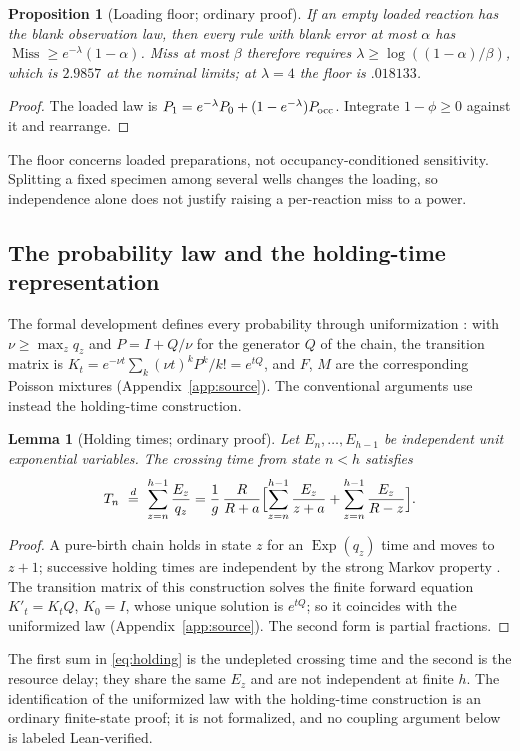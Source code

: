 \documentclass[11pt,a4paper]{article}
\theoremstyle{plain}
\newtheorem{proposition}[theorem]{Proposition}
\newtheorem{lemma}[theorem]{Lemma}
\theoremstyle{definition}
\theoremstyle{remark}
\newcommand{\Miss}{\operatorname{Miss}}
\newcommand{\Ex}{\operatorname{Exp}}
\begin{document}
\begin{proposition}[Loading floor; ordinary proof]\label{prop:floor}
If an empty loaded reaction has the blank observation law, then every rule with blank error at most $\alpha$ has $\Miss\ge e^{-\lambda}(1-\alpha)$. Miss at most $\beta$ therefore requires $\lambda\ge\log((1-\alpha)/\beta)$, which is $2.9857$ at the nominal limits; at $\lambda=4$ the floor is $.018133$.
\end{proposition}
\begin{proof}
The loaded law is $P_1=e^{-\lambda}P_0+(1-e^{-\lambda})P_{\rm occ}$. Integrate $1-\phi\ge0$ against it and rearrange.
\end{proof}
The floor concerns loaded preparations, not occupancy-conditioned sensitivity. Splitting a fixed specimen among several wells changes the loading, so independence alone does not justify raising a per-reaction miss to a power.

\subsection{The probability law and the holding-time representation}\label{sec:law}
The formal development defines every probability through uniformization \citep{jensen1953,norris1997}: with $\nu\ge\max_zq_z$ and $P=I+Q/\nu$ for the generator $Q$ of the chain, the transition matrix is $K_t=e^{-\nu t}\sum_k(\nu t)^kP^k/k!=e^{tQ}$, and $F$, $M$ are the corresponding Poisson mixtures (Appendix~\ref{app:source}). The conventional arguments use instead the holding-time construction.

\begin{lemma}[Holding times; ordinary proof]\label{lem:holding}
Let $E_n,\dots,E_{h-1}$ be independent unit exponential variables. The crossing time from state $n<h$ satisfies
\begin{equation}\label{eq:holding}
T_n\ \overset{d}{=}\ \sum_{z=n}^{h-1}\frac{E_z}{q_z}
=\frac1g\,\frac{R}{R+a}\Bigl[\sum_{z=n}^{h-1}\frac{E_z}{z+a}+\sum_{z=n}^{h-1}\frac{E_z}{R-z}\Bigr].
\end{equation}
\end{lemma}
\begin{proof}
A pure-birth chain holds in state $z$ for an $\Ex(q_z)$ time and moves to $z+1$; successive holding times are independent by the strong Markov property \citep{feller1968,norris1997}. The transition matrix of this construction solves the finite forward equation $K'_t=K_tQ$, $K_0=I$, whose unique solution is $e^{tQ}$; so it coincides with the uniformized law (Appendix~\ref{app:source}). The second form is partial fractions.
\end{proof}
The first sum in \eqref{eq:holding} is the undepleted crossing time and the second is the resource delay; they share the same $E_z$ and are not independent at finite $h$. The identification of the uniformized law with the holding-time construction is an ordinary finite-state proof; it is not formalized, and no coupling argument below is labeled Lean-verified.
\end{document}
